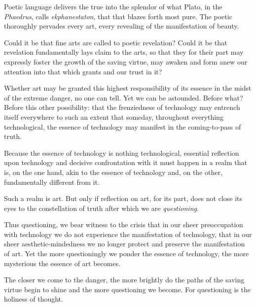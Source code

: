 \documentclass[paper=a4, fontsize=11pt,twoside]{scrartcl}
\begin{document}
\vspace{5mm}

Poetic language delivers the true into the splendor of what Plato, in the \textit{Phaedrus}, calls \textit{ekphanestaton}, that that blazes forth most pure. The poetic thoroughly pervades every art, every revealing of the manifestation of beauty.

Could it be that fine arts are called to poetic revelation? Could it be that revelation fundamentally lays claim to the arts, so that they for their part may expressly foster the growth of the saving virtue, may awaken and form anew our attention into that which grants and our trust in it?

Whether art may be granted this highest responsibility of its essence in the midst of the extreme danger, no one can tell. Yet we can be astounded. Before what? Before this other possibility: that the frenziedness of technology may entrench itself everywhere to such an extent that someday, throughout everything technological, the essence of technology may manifest in the coming-to-pass of truth.

Because the essence of technology is nothing technological, essential reflection upon technology and decisive confrontation with it must happen in a realm that is, on the one hand, akin to the essence of technology and, on the other, fundamentally different from it.

Such a realm is art. But only if reflection on art, for its part, does not close its eyes to the constellation of truth after which we are \textit{questioning}.

\vspace{5mm}

Thus questioning, we bear witness to the crisis that in our sheer preoccupation with technology we do not experience the manifestation of technology, that in our sheer aesthetic-mindedness we no longer protect and preserve the manifestation of art. Yet the more questioningly we ponder the essence of technology, the more mysterious the essence of art becomes.

The closer we come to the danger, the more brightly do the paths of the saving virtue begin to shine and the more questioning we become. For questioning is the holiness of thought.
\end{document}
